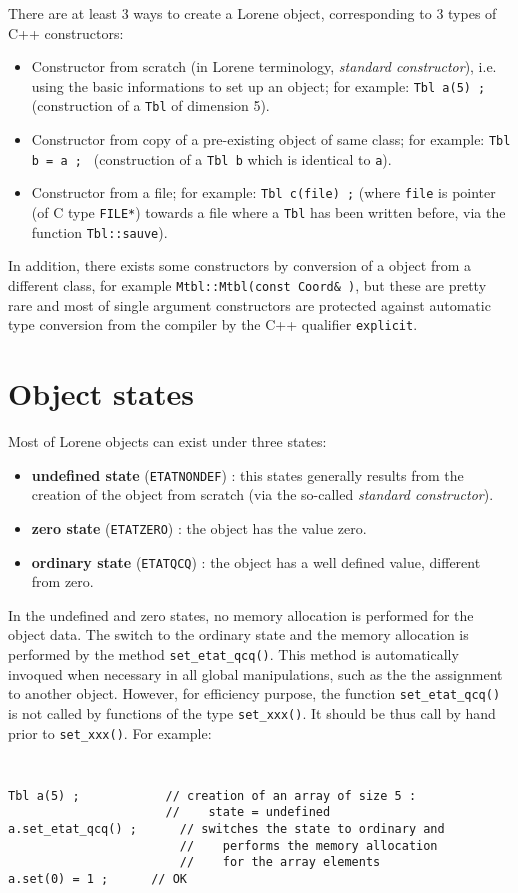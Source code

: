 \documentclass[12pt]{article}
\begin{document}
There are at least 3 ways to create a {\sc Lorene} object, corresponding
to 3 types of C++ constructors:
\begin{itemize}
\item Constructor from scratch (in {\sc Lorene} terminology,
{\em standard constructor}), i.e. using the basic informations
to set up an object; for example: {\tt Tbl a(5) ;} (construction of a
{\tt Tbl} of dimension 5).
\item Constructor from copy of a pre-existing object of same class;
for example: {\tt Tbl b = a ; } (construction of a {\tt Tbl b} which is
identical to {\tt a}).
\item Constructor from a file; for example: {\tt Tbl c(file) ;}
(where {\tt file} is pointer (of C type {\tt FILE*}) towards a
file where a {\tt Tbl} has been written before, via the function
{\tt Tbl::sauve}).
\end{itemize}
In addition, there exists some constructors {by conversion} of
a object from a different class, for example
{\tt Mtbl::Mtbl(const Coord\& )}, but these are pretty rare and
most of single argument constructors are protected against
automatic type conversion from the compiler by the C++
qualifier {\tt explicit}.


\section{Object states}

Most of {\sc Lorene} objects can exist under three states:

\begin{itemize}
\item {\bf undefined state} ({\tt ETATNONDEF}) :
this states generally results from the creation of the object from
scratch (via the so-called {\em standard constructor}).
\item {\bf zero state} ({\tt ETATZERO}) : the object has the value zero.
\item {\bf ordinary state} ({\tt ETATQCQ}) : the object has a well
defined value, different from zero.
\end{itemize}

In the undefined and zero states, no memory allocation is performed for
the object data. The switch to the ordinary state and the
memory allocation is performed by the method {\tt set\_etat\_qcq()}.
This method is automatically invoqued when necessary
in all global manipulations, such as the the assignment to another
object. However, for efficiency purpose, the function {\tt set\_etat\_qcq()}
is not called by functions of the type {\tt set\_xxx()}.
It should be thus call by hand prior to {\tt set\_xxx()}. For example:
{\tt
\begin{verbatim}
Tbl a(5) ;            // creation of an array of size 5 :
                      //    state = undefined
a.set_etat_qcq() ;      // switches the state to ordinary and
                        //    performs the memory allocation
                        //    for the array elements
a.set(0) = 1 ; 		// OK
\end{verbatim}
}
\end{document}
